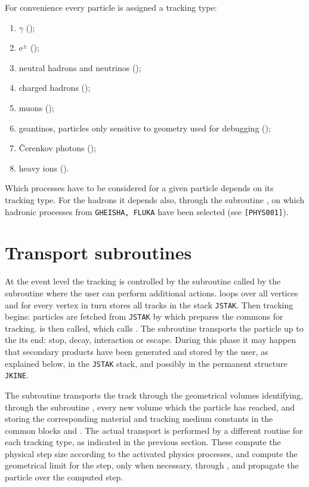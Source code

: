 For convenience
every particle is assigned a tracking type:
\begin{enumerate}
\item $\gamma$ ();
\item e$^{\pm}$ ();
\item neutral hadrons and neutrinos ();
\item charged hadrons ();
\item muons ();
\item geantinos, particles only sensitive to geometry
used for debugging ();
\item \v{C}erenkov photons ();
\item heavy ions ().
\end{enumerate}

Which processes have
to be considered for a given particle depends on its tracking type.
For the hadrons it depends also, through the subroutine , on
which hadronic processes from {\tt GHEISHA, FLUKA} have been selected
(see {\tt [PHYS001]}).

\section{Transport subroutines}
 
At the event level the tracking is  controlled by the subroutine 
called by the subroutine  where the user can perform additional
actions.
 loops over all vertices and for every vertex in turn
stores all tracks
in the stack {\tt JSTAK}. Then tracking begins: particles are fetched
from {\tt JSTAK} by  which prepares the commons for tracking.
 is then called, which calls .
The subroutine    transports  the  particle up to the its end:
stop, decay, interaction or escape. During this phase it may
happen that  secondary products have  been generated and  stored by
the user, as explained below, in the {\tt JSTAK} stack, and possibly in the
permanent structure {\tt JKINE}.

The subroutine  transports the track through the geometrical 
volumes
identifying, through the subroutine
, every new volume which the particle has reached, and storing
the corresponding  material and  tracking medium  constants in  the
common blocks  and . The actual transport
is performed by a different routine for each tracking type, as indicated in
the previous section.
These compute the physical step size according to the activated
physics processes, and compute the geometrical limit for the step,
only when necessary, through , and propagate the particle
over the computed step.

